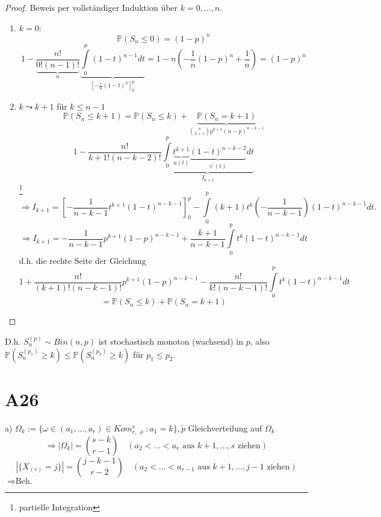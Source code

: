 \documentclass[a4paper,11pt,notitlepage]{report}
\newcommand{\Prim}{{\ensuremath{\mathbb{P}}}}
\begin{document}
\begin{proof}
	Beweis per vollständiger Induktion über $k = 0, \ldots, n$.
	\begin{enumerate}
		\item $k=0$:
		$$\Prim(S_n \leq 0) = (1-p)^n$$
		$$1- \frac{n!}{\underbrace{0!(n-1)!}_{n}} \underbrace{\int\limits_{0}^p{(1-t)^{n-1} dt}}_{[-\frac{1}{n}(1-t)^n]_0^p} = 1-n(-\frac{1}{n} (1-p)^n + \frac{1}{n}) = (1-p)^n$$
		\item $k \leadsto k+1$ für $k \leq n-1$
		$$\Prim(S_n \leq k+1) = \Prim(S_n \leq k) + \underbrace{\Prim(S_n = k+1)}_{{n \choose k+1} p^{k+1} (n-p)^{n-k-1}}$$
		$$1- \frac{n!}{k+1!(n-k-2)!} \underbrace{\int\limits_{0}^p{\underbrace{t^{k+1}}_{u(t)} \underbrace{(1-t)^{n-k-2}}_{v^\prime(t)} dt}}_{I_{k+1}}$$ \footnote{partielle Integration}
		$$\Rightarrow I_{k+1} = [- \frac{1}{n-k-1} t^{k+1} (1-t)^{n-k-1}]_0^p - \int\limits_0^p{(k+1)t^k(- \frac{1}{n-k-1}) (1-t)^{n-k-1} dt.}$$
		$$\Rightarrow I_{k+1} = - \frac{1}{n-k-1}p^{k+1}(1-p)^{n-k-1} + \frac{k+1}{n-k-1} \int\limits_0^p{t^k (1-t)^{n-k-1} dt}$$
		d.h. die rechte Seite der Gleichung
		$$1 + \frac{n!}{(k+1)!(n-k-1)!} p^{k+1} (1-p)^{n-k-1} - \frac{n!}{k!(n-k-1)!} \int\limits_0^p{t^k (1-t)^{n-k-1} dt}$$
		$$= \Prim(S_n \leq k) + \Prim(S_n = k+1)$$
	\end{enumerate}
\end{proof}

D.h. $S_n^{(p)} \sim Bin(n,p)$ ist stochastisch monoton (wachsend) in $p$, also $\Prim(S_n^{(p_1)} \geq k) \leq \Prim(S_n^{(p_2)} \geq k)$ für $p_1 \leq p_2.$

\section{A26}
a) $\Omega_k := \{ \omega \in (a_1, \ldots, a_r) \in Kom_{r, \neq}^s \colon a_1 = k\}, \widetilde{p}$ Gleichverteilung auf $\Omega_k$
$$\Rightarrow |\Omega_k| = {s-k \choose r-1} \quad (a_2 < \ldots < a_r \text{ aus } k+1, \ldots,s \text{ ziehen})$$
$$|\{X_{(r)} = j\}| = {j-k-1 \choose r-2} \quad (a_2 < \ldots < a_{r-1} \text{ aus } k+1, \ldots, j-1 \text{ ziehen})$$
$\Rightarrow \text{Beh.}$
\end{document}
